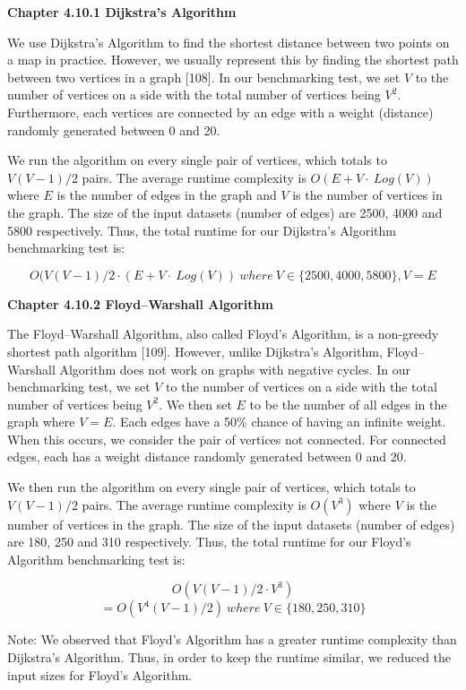 \bigskip
\textbf{{\normalsize Chapter 4.10.1 Dijkstra's Algorithm}}

We use Dijkstra's Algorithm to find the shortest distance between two points on a map in practice. However, we usually represent this by finding the shortest path between two vertices in a graph [108]. In our benchmarking test, we set \(V\) to the number of vertices on a side with the total number of vertices being \(V^2\). Furthermore, each vertices are connected by an edge with a weight (distance) randomly generated between 0 and 20.

We run the algorithm on every single pair of vertices, which totals to \(V(V-1)/2\) pairs. The average runtime complexity is \(O(E+V\cdot\ Log(V))\) where \(E\) is the number of edges in the graph and \(V\) is the number of vertices in the graph. The size of the input datasets (number of edges) are 2500, 4000 and 5800 respectively. Thus, the total runtime for our Dijkstra's Algorithm benchmarking test is:

\[ O(V(V-1)/2 \cdot (E+V\cdot\ Log(V))\ where\ V \in \{2500, 4000, 5800\}, V = E \]

\bigskip
\textbf{{\normalsize Chapter 4.10.2 Floyd–Warshall Algorithm}}

The Floyd–Warshall Algorithm, also called Floyd's Algorithm, is a non-greedy shortest path algorithm [109]. However, unlike Dijkstra's Algorithm, Floyd–Warshall Algorithm does not work on graphs with negative cycles. In our benchmarking test, we set \(V\) to the number of vertices on a side with the total number of vertices being \(V^2\). We then set \(E\) to be the number of all edges in the graph where \(V = E\). Each edges have a 50\% chance of having an infinite weight. When this occurs, we consider the pair of vertices not connected. For connected edges, each has a weight distance randomly generated between 0 and 20.

We then run the algorithm on every single pair of vertices, which totals to \(V(V-1)/2\) pairs. The average runtime complexity is \(O(V^3)\) where \(V\) is the number of vertices in the graph. The size of the input datasets (number of edges) are 180, 250 and 310 respectively. Thus, the total runtime for our Floyd’s Algorithm benchmarking test is:

\[ O(V(V-1)/2 \cdot V^3) \]
\[ =O(V^4(V-1)/2)\ where\ V \in \{180, 250, 310\}  \]

Note: We observed that Floyd's Algorithm has a greater runtime complexity than Dijkstra's Algorithm. Thus, in order to keep the runtime similar, we reduced the input sizes for Floyd's Algorithm.

